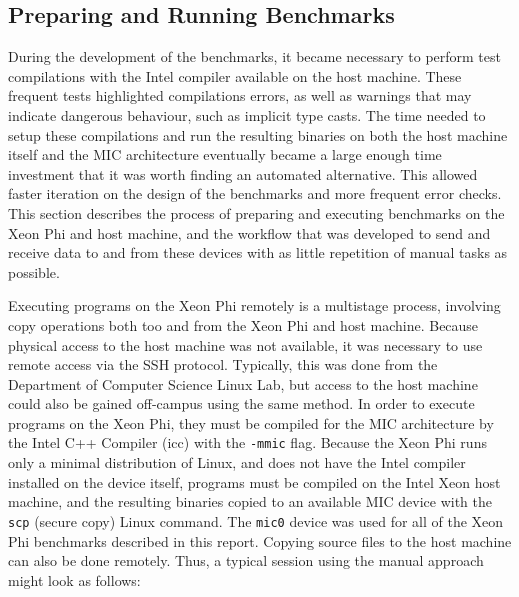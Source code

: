 \documentclass{report}
\begin{document}
\subsection{Preparing and Running Benchmarks} \label{Sec:prepandrunbench}
During the development of the benchmarks, it became necessary to perform test compilations with the Intel compiler available on the host machine. These frequent tests highlighted compilations errors, as well as warnings that may indicate dangerous behaviour, such as implicit type casts. The time needed to setup these compilations and run the resulting binaries on both the host machine itself and the MIC architecture eventually became a large enough time investment that it was worth finding an automated alternative. This allowed faster iteration on the design of the benchmarks and more frequent error checks. This section describes the process of preparing and executing benchmarks on the Xeon Phi and host machine, and the workflow that was developed to send and receive data to and from these devices with as little repetition of manual tasks as possible.

Executing programs on the Xeon Phi remotely is a multistage process, involving copy operations both too and from the Xeon Phi and host machine. Because physical access to the host machine was not available, it was necessary to use remote access via the SSH protocol. Typically, this was done from the Department of Computer Science Linux Lab, but access to the host machine could also be gained off-campus using the same method. In order to execute programs on the Xeon Phi, they must be compiled for the MIC architecture by the Intel C++ Compiler (icc) with the \verb!-mmic! flag. Because the Xeon Phi runs only a minimal distribution of Linux, and does not have the Intel compiler installed on the device itself, programs must be compiled on the Intel Xeon host machine, and the resulting binaries copied to an available MIC device with the \verb!scp! (secure copy) Linux command. The \verb!mic0! device was used for all of the Xeon Phi benchmarks described in this report. Copying source files to the host machine can also be done remotely. Thus, a typical session using the manual approach might look as follows:
\hfill\\
\end{document}

